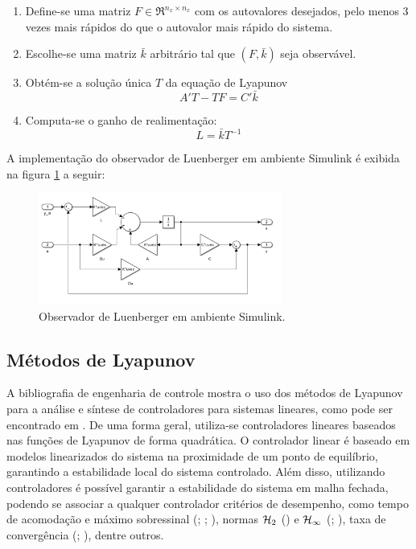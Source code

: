 \begin{enumerate}
  \item Define-se uma matriz $F \in \Re^{n_{x} \times n_{x}}$ com os autovalores desejados, pelo menos 3 vezes mais rápidos do que o autovalor mais rápido do sistema.
  \item Escolhe-se uma matriz $\bar{k}$ arbitrário tal que $(F,\bar{k})$ seja observável.
  \item {Obtém-se a solução única $T$ da equação de Lyapunov
  \begin{equation} \label{eq:lyapunov}
      A'T-TF=C'\bar{k}
  \end{equation}}
  \item {Computa-se o ganho de realimentação:
  \begin{equation} \label{eq:ganho}
      L=\bar{k}T^{-1}
  \end{equation}}
\end{enumerate} 

A implementação do observador de Luenberger em ambiente Simulink é exibida na figura \ref{fig:luemberger_simulink} a seguir:

\FloatBarrier
\begin{figure}[htbp]
  \begin{centering}
    \includegraphics[width=8cm]{img/luenberger_simulink.png}
    \caption{Observador de Luenberger em ambiente Simulink.} 
    \label{fig:luemberger_simulink}
  \end{centering}
\end{figure}
\FloatBarrier

\subsection{Métodos de Lyapunov}
A bibliografia de engenharia de controle mostra o uso dos métodos de Lyapunov para a análise e síntese de controladores para sistemas lineares, como pode ser encontrado em \cite{ChenLSTI}. De uma forma geral, utiliza-se controladores lineares baseados nas funções de Lyapunov de forma quadrática. O controlador linear é baseado em modelos linearizados do sistema na proximidade de um ponto de equilíbrio, garantindo a estabilidade local do sistema controlado. Além disso, utilizando controladores é possível garantir a estabilidade do sistema em malha fechada, podendo se associar a qualquer controlador critérios de desempenho, como tempo de acomodação e máximo sobressinal (\cite{Hang1987RefinementsOT}; \cite{601347}; \cite{1049598}), normas $\mathcal{H}_2$ (\cite{4789992}) e $\mathcal{H}_\infty$ (\cite{Petersen}; \cite{Wang1992RobustCO}), taxa de convergência (\cite{Elia2001StabilizationInformation}; \cite{LORIA200213}), dentre outros.

